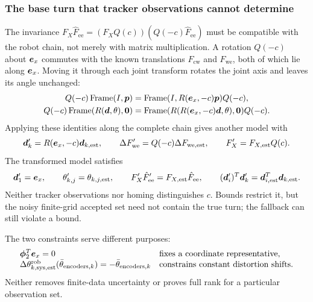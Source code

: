 \documentclass[../main.tex]{subfiles}
\begin{document}
\subsubsection{The base turn that tracker observations cannot determine}\label{sec:math-turn}
The invariance $F_X\hat F_{\mathrm{ee}}=(F_XQ(c))(Q(-c)\hat F_{\mathrm{ee}})$ must be compatible with the robot chain, not merely with matrix multiplication. A rotation $Q(-c)$ about $\bm{e}_x$ commutes with the known translations $F_{\mathrm{cw}}$ and $F_{\mathrm{we}}$, both of which lie along $\bm{e}_x$. Moving it through each joint transform rotates the joint axis and leaves its angle unchanged:
\begin{equation*}
\begin{aligned}
Q(-c)\operatorname{Frame}(I,\bm{p})
&=\operatorname{Frame}(I,R(\bm{e}_x,-c)\bm{p})Q(-c),\\
Q(-c)\operatorname{Frame}(R(\bm{d},\theta),\bm{0})
&=\operatorname{Frame}(R(R(\bm{e}_x,-c)\bm{d},\theta),\bm{0})Q(-c).
\end{aligned}
\end{equation*}
Applying these identities along the complete chain gives another model with
\begin{equation*}
\bm{d}'_k=R(\bm{e}_x,-c)\bm{d}_{k,\mathrm{est}},\qquad
\Delta F'_{\mathrm{we}}=Q(-c)\Delta F_{\mathrm{we},\mathrm{est}},\qquad
F'_X=F_{X,\mathrm{est}}Q(c).
\end{equation*}
The transformed model satisfies
\begin{equation*}
\bm{d}'_1=\bm{e}_x,\qquad
\theta'_{k,j}=\theta_{k,j,\mathrm{est}},\qquad
F'_X\hat F'_{\mathrm{ee}}=F_{X,\mathrm{est}}\hat F_{\mathrm{ee}},\qquad
(\bm{d}'_i)^T\bm{d}'_k=\bm{d}_{i,\mathrm{est}}^T\bm{d}_{k,\mathrm{est}}.
\end{equation*}
Neither tracker observations nor homing distinguishes $c$. Bounds restrict it, but the noisy finite-grid accepted set need not contain the true turn; the fallback can still violate a bound.

The two constraints serve different purposes:
\begin{equation*}
\begin{array}{ll}
\bm{\phi}_2^T\bm{e}_x=0&\text{fixes a coordinate representative},\\
\Delta\theta^{\mathrm{rob}}_{k,\mathrm{sys},\mathrm{est}}(\bar\theta_{\mathrm{encoders},k})=-\bar\theta_{\mathrm{encoders},k}
&\text{constrains constant distortion shifts}.
\end{array}
\end{equation*}
Neither removes finite-data uncertainty or proves full rank for a particular observation set.
\end{document}
